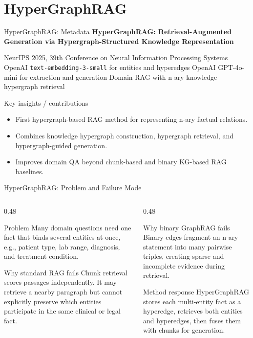 \section{HyperGraphRAG}

\begin{frame}{HyperGraphRAG: Metadata}
\small
\textbf{HyperGraphRAG: Retrieval-Augmented Generation via Hypergraph-Structured Knowledge Representation}

\paperinfo
{NeurIPS 2025, 39th Conference on Neural Information Processing Systems}
{OpenAI \texttt{text-embedding-3-small} for entities and hyperedges}
{OpenAI GPT-4o-mini for extraction and generation}
{Domain RAG with n-ary knowledge hypergraph retrieval}

\begin{block}{Key insights / contributions}
\scriptsize
\begin{itemize}
  \item First hypergraph-based RAG method for representing n-ary factual relations.
  \item Combines knowledge hypergraph construction, hypergraph retrieval, and hypergraph-guided generation.
  \item Improves domain QA beyond chunk-based and binary KG-based RAG baselines.
\end{itemize}
\end{block}
\end{frame}

\begin{frame}{HyperGraphRAG: Problem and Failure Mode}
\scriptsize
\begin{columns}[T,onlytextwidth]
  \begin{column}{0.48\textwidth}
    \begin{block}{Problem}
      Many domain questions need one fact that binds several entities at once, e.g., patient type, lab range, diagnosis, and treatment condition.
    \end{block}
    \begin{block}{Why standard RAG fails}
      Chunk retrieval scores passages independently. It may retrieve a nearby paragraph but cannot explicitly preserve which entities participate in the same clinical or legal fact.
    \end{block}
  \end{column}
  \begin{column}{0.48\textwidth}
    \begin{block}{Why binary GraphRAG fails}
      Binary edges fragment an n-ary statement into many pairwise triples, creating sparse and incomplete evidence during retrieval.
    \end{block}
    \begin{block}{Method response}
      HyperGraphRAG stores each multi-entity fact as a hyperedge, retrieves both entities and hyperedges, then fuses them with chunks for generation.
    \end{block}
  \end{column}
\end{columns}
\end{frame}


